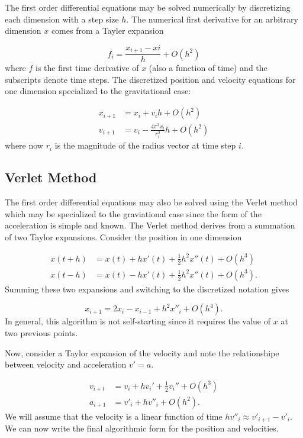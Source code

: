 \documentclass[10pt,showpacs,preprintnumbers,footinbib,amsmath,amssymb,aps,prl,twocolumn,groupedaddress,superscriptaddress,showkeys]{revtex4-1}
\newcommand{\fourpisqr}{
	\ensuremath{ 4 \pi ^2} }
\begin{document}
The first order differential equations may be solved numerically by
discretizing each dimension with a step size $h$. The numerical first
derivative for an arbitrary dimension $x$ comes from a Tayler
expansion

\begin{equation*}
	f _{i} = \frac{x _{i+1} - x{i}}{h} + O(h^2)
\end{equation*}
where $f$ is the first time derivative of $x$ (also a function of time)
and the subscripts denote time steps. The discretized position and velocity
equations for one dimension specialized to the gravitational case:

\begin{align*}
	x_{i+1} &= x_i + v_{i}h + O(h^2)\\
	v_{i+1} &= v_i - \frac{ \fourpisqr x_i }{r_i ^3 } h + O(h^2)
\end{align*}
where now $r_i$ is the magnitude of the radius vector at time step $i$.

\subsection*{Verlet Method}

The first order differential equations may also be solved using the
Verlet method which may be specialized to the graviational case
since the form of the acceleration is simple and known. The Verlet
method derives from a summation of two Taylor expansions. Consider
the position in one dimension

\begin{align*}
	x(t+h) &= x(t) + h x'(t) + \frac{1}{2} h^2  x''(t) + O(h^3)\\
	x(t-h) &= x(t)  - h x'(t) + \frac{1}{2} h^2  x''(t) + O(h^3).
\end{align*}
Summing these two expansions and switching to the discretized
notation gives

\begin{equation*}
	x_{i+1} = 2 x_i - x_{i-1} + h^2 x''_i + O(h^4).
\end{equation*}
In general, this algorithm is not self-starting since it requires the
value of $x$ at two previous points.

Now, consider a Taylor expansion of the velocity and note the
relationshipe between velocity and acceleration $v' = a$.

\begin{align*}
	v_{i+t} &= v_i + h v_i ' + \frac{1}{2} v_i '' + O(h^3)\\
	a_{i+1} &= v'_i + h v''_i + O(h^2).
\end{align*}
We will assume that the velocity is a linear function of time
$hv''_i \approx v'_{i+1} - v'_i$. We can now write the final
algorithmic form for the position and velocities.
\end{document}
